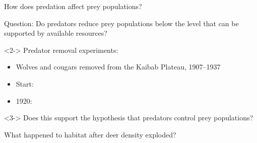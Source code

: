 \begin{frame}[t]
    \begin{adjustwidth}{-2em}{-1.5em}
        \vspace{-3mm}
        How does predation affect prey populations?

        \vspace{2mm}
        Question: Do predators reduce prey populations below the level that can
        be supported by available resources?

        \vspace{2mm}
        \begin{uncoverenv}<2->
        Predator removal experiments:
        \begin{itemize}
            \item Wolves and cougars removed from the Kaibab Plateau, 1907--1937

            \vspace{2mm}
            \item Start:
                

            \vspace{1mm}
            \item 1920:
                

        \end{itemize}
        \end{uncoverenv}

        \begin{uncoverenv}<3->
        \vspace{2mm}
        Does this support the hypothesis that predators control prey
        populations?


        What happened to habitat after deer density exploded?


        \end{uncoverenv}

    \end{adjustwidth}
\end{frame}


